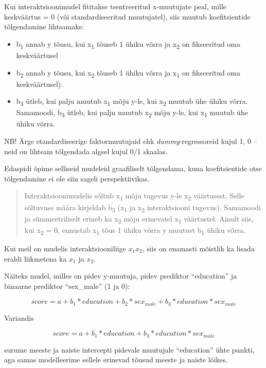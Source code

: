 \documentclass[]{book}
\begin{document}
Kui interaktsioonimudel fititakse tsentreeritud x-muutujate peal, mille
keskväärtus = 0 (või standardiseeritud muutujatel), siis muutub
koefitsientide tõlgendamine lihtsamaks:

\begin{itemize}
\item
  b\textsubscript{1} annab y tõusu, kui x\textsubscript{1} tõuseb 1
  ühiku võrra ja x\textsubscript{2} on fikseeritud oma keskväärtusel
\item
  b\textsubscript{2} annab y tõusu, kui x\textsubscript{2} tõuseb 1
  ühiku võrra ja x\textsubscript{1} on fikseeritud oma keskväärtusel).
\item
  b\textsubscript{3} ütleb, kui palju muutub x\textsubscript{1} mõju
  y-le, kui x\textsubscript{2} muutub ühe ühiku võrra. Samamoodi,
  b\textsubscript{3} ütleb, kui palju muutub x\textsubscript{2} mõju
  y-le, kui x\textsubscript{1} muutub ühe ühiku võrra.
\end{itemize}

NB! Ärge standardiseerige faktormuutujaid ehk \emph{dummy}-regressoreid
kujul 1, 0 -- neid on lihtsam tõlgendada algsel kujul 0/1 skaalas.

Edaspidi õpime selliseid mudeleid graafiliselt tõlgendama, kuna
koefitsientide otse tõlgendamine ei ole siin sageli perspektiivikas.

\begin{quote}
Interaktsioonimudelis sõltub x\textsubscript{1} mõju tugevus y-le
x\textsubscript{2} väärtusest. Selle sõltuvuse määra kirjeldab
b\textsubscript{3} (x\textsubscript{1} ja x\textsubscript{2}
interaktsiooni tugevus). Samamoodi ja sümmeetriliselt erineb ka
x\textsubscript{2} mõju erinevatel x\textsubscript{1} väärtustel. Ainult
siis, kui x\textsubscript{2} = 0, ennustab x\textsubscript{1} tõus 1
ühiku võrra y muutust b\textsubscript{1} ühiku võrra.
\end{quote}

Kui meil on mudelis interaktsiooniliige \(x_1x_2\), siis on enamasti
mõistlik ka lisada eraldi liikmetena ka \(x_1\) ja \(x_2\).

Näiteks mudel, milles on pidev y-muutuja, pidev prediktor ``education''
ja binaarne prediktor ``sex\_male'' (1 ja 0):

\[score = a + b_1 * education + b_2 * sex_{male} + b_3 * education * sex_{male}\]

Variandis

\[score = a + b_1 * education + b_3 * education * sex_{male}\]

surume meeste ja naiste intercepti pidevale muutujale ``education'' ühte
punkti, aga samas modelleerime sellele erinevad tõusud meeste ja naiste
lõikes.
\end{document}
